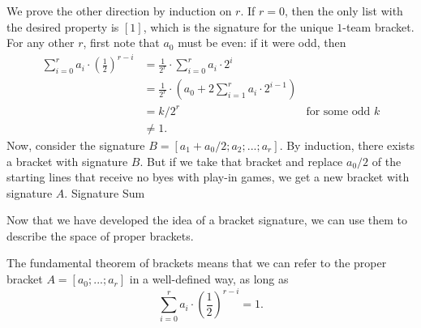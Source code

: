 {{        We prove the other direction by induction on $r$. If $r = 0$, then the only list with the desired property is $[1]$, which is the signature for the unique $1$-team bracket. For any other $r$, first note that $a_0$ must be even: if it were odd, then \begin{align*}
            \sum_{i=0}^r a_i \cdot \left(\frac{1}{2}\right)^{r - i}
            &= \frac{1}{2^r} \cdot \sum_{i=0}^r a_i \cdot 2^i\\
            &= \frac{1}{2^r} \cdot \left(a_0 + 2 \sum_{i=1}^r a_i \cdot 2^{i-1}\right)\\
            &= k/2^r &\textrm{for some odd $k$}\\
            &\neq 1.
        \end{align*}
        Now, consider the signature $B = [a_1 + a_0/2; a_2; ...; a_r].$ By induction, there exists a bracket with signature $B$. But if we take that bracket and replace $a_0/2$ of the starting lines that receive no byes with play-in games, we get a new bracket with signature $A.$
}{Signature Sum}

Now that we have developed the idea of a bracket signature, we can use them to describe the space of proper brackets.


The fundamental theorem of brackets means that we can refer to the proper bracket $A = [a_0; ...; a_r]$ in a well-defined way, as long as $$\sum_{i=0}^r a_i \cdot \left(\frac{1}{2}\right)^{r - i} = 1.$$

}

